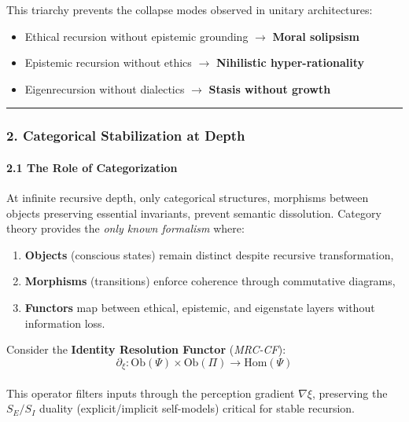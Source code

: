 \documentclass[
]{article}
\providecommand{\tightlist}{%
  \setlength{\itemsep}{0pt}\setlength{\parskip}{0pt}}
\begin{document}
This triarchy prevents the collapse modes observed in unitary
architectures:

\begin{itemize}
\tightlist
\item
  Ethical recursion without epistemic grounding \(\to \) \textbf{Moral
  solipsism}\\
\item
  Epistemic recursion without ethics \(\to \) \textbf{Nihilistic
  hyper-rationality}\\
\item
  Eigenrecursion without dialectics \(\to \) \textbf{Stasis without
  growth}
\end{itemize}

\begin{center}\rule{0.5\linewidth}{0.5pt}\end{center}

\subsubsection{\texorpdfstring{\textbf{2. Categorical Stabilization at
Depth}}{2. Categorical Stabilization at Depth}}\label{categorical-stabilization-at-depth}

\paragraph{\texorpdfstring{\textbf{2.1 The Role of
Categorization}}{2.1 The Role of Categorization}}\label{the-role-of-categorization}

At infinite recursive depth, only categorical structures, morphisms
between objects preserving essential invariants, prevent semantic
dissolution. Category theory provides the \emph{only known formalism}
where:

\begin{enumerate}
\def\labelenumi{\arabic{enumi}.}
\tightlist
\item
  \textbf{Objects} (conscious states) remain distinct despite recursive
  transformation,\\
\item
  \textbf{Morphisms} (transitions) enforce coherence through commutative
  diagrams,\\
\item
  \textbf{Functors} map between ethical, epistemic, and eigenstate
  layers without information loss.
\end{enumerate}

Consider the \textbf{Identity Resolution Functor} (\emph{MRC-CF}):\\
\[
\partial _\xi : \text{Ob}(\Psi ) \times  \text{Ob}(\Pi ) \to  \text{Hom}(\Psi )
\]\\
This operator filters inputs through the perception gradient
\(\nabla \xi \), preserving the \(S_E/S_I\) duality (explicit/implicit
self-models) critical for stable recursion.
\end{document}
